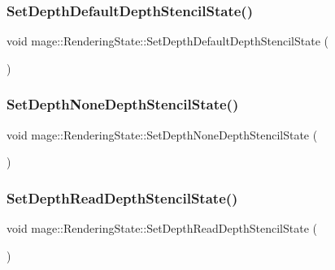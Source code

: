 \hypertarget{structmage_1_1_rendering_state_a88933420c94d4127973d8148ccd97e86}{}\label{structmage_1_1_rendering_state_a88933420c94d4127973d8148ccd97e86} 
\subsubsection{\texorpdfstring{Set\+Depth\+Default\+Depth\+Stencil\+State()}{SetDepthDefaultDepthStencilState()}}
{\footnotesize\ttfamily void mage\+::\+Rendering\+State\+::\+Set\+Depth\+Default\+Depth\+Stencil\+State (\begin{DoxyParamCaption}{ }\end{DoxyParamCaption})}

\hypertarget{structmage_1_1_rendering_state_a67db088d08560ab5f3adde28032972a4}{}\label{structmage_1_1_rendering_state_a67db088d08560ab5f3adde28032972a4} 
\subsubsection{\texorpdfstring{Set\+Depth\+None\+Depth\+Stencil\+State()}{SetDepthNoneDepthStencilState()}}
{\footnotesize\ttfamily void mage\+::\+Rendering\+State\+::\+Set\+Depth\+None\+Depth\+Stencil\+State (\begin{DoxyParamCaption}{ }\end{DoxyParamCaption})}

\hypertarget{structmage_1_1_rendering_state_a86ff2bb5739ada7ffcc275f4624d2a24}{}\label{structmage_1_1_rendering_state_a86ff2bb5739ada7ffcc275f4624d2a24} 
\subsubsection{\texorpdfstring{Set\+Depth\+Read\+Depth\+Stencil\+State()}{SetDepthReadDepthStencilState()}}
{\footnotesize\ttfamily void mage\+::\+Rendering\+State\+::\+Set\+Depth\+Read\+Depth\+Stencil\+State (\begin{DoxyParamCaption}{ }\end{DoxyParamCaption})}

